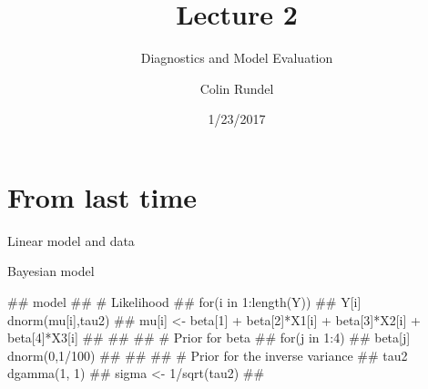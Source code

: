 \documentclass[11pt,ignorenonframetext,]{beamer}
\title{Lecture 2}
\subtitle{Diagnostics and Model Evaluation}
\author{Colin Rundel}
\date{1/23/2017}
\newenvironment{Shaded}{}{}
\newcommand{\KeywordTok}[1]{\textcolor[rgb]{0.00,0.44,0.13}{\textbf{{#1}}}}
\newcommand{\DataTypeTok}[1]{\textcolor[rgb]{0.56,0.13,0.00}{{#1}}}
\newcommand{\DecValTok}[1]{\textcolor[rgb]{0.25,0.63,0.44}{{#1}}}
\newcommand{\FloatTok}[1]{\textcolor[rgb]{0.25,0.63,0.44}{{#1}}}
\newcommand{\StringTok}[1]{\textcolor[rgb]{0.25,0.44,0.63}{{#1}}}
\newcommand{\NormalTok}[1]{{#1}}
\let\oldShaded\Shaded
\let\endoldShaded\endShaded
\renewenvironment{Shaded}{\footnotesize\begin{spacing}{0.9}\oldShaded}{\endoldShaded\end{spacing}}
\let\oldverbatim\verbatim
\let\endoldverbatim\endverbatim
\renewenvironment{verbatim}{\footnotesize\begin{spacing}{0.9}\oldverbatim}{\endoldverbatim\end{spacing}}
\begin{document}
\frame{\titlepage}

\section{From last time}\label{from-last-time}

\begin{frame}[fragile]{Linear model and data}

\begin{Shaded}
\end{Shaded}

\end{frame}

\begin{frame}[fragile]{Bayesian model}

\begin{verbatim}
## model{
##   # Likelihood
##   for(i in 1:length(Y)){
##     Y[i]   ~ dnorm(mu[i],tau2)
##     mu[i] <- beta[1] + beta[2]*X1[i] + beta[3]*X2[i] + beta[4]*X3[i]
##   }
## 
##   # Prior for beta
##   for(j in 1:4){
##     beta[j] ~ dnorm(0,1/100)
##   }
## 
##   # Prior for the inverse variance
##   tau2   ~ dgamma(1, 1)
##   sigma <- 1/sqrt(tau2)
## }
\end{verbatim}

\end{frame}
\end{document}
